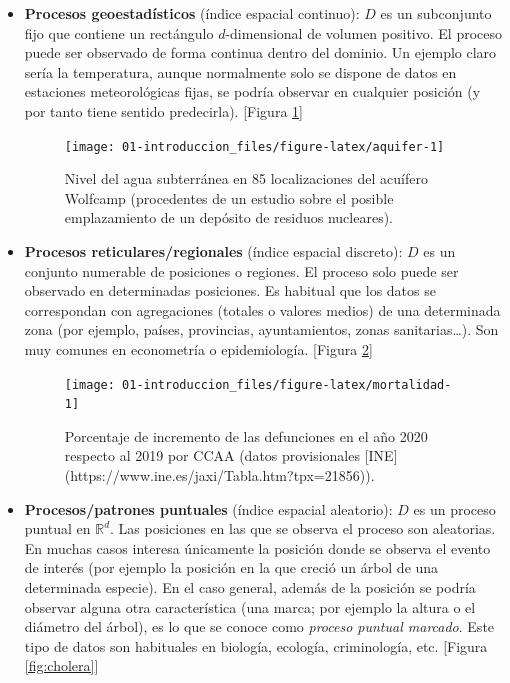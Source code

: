 \documentclass[
  spanish,
]{book}
\theoremstyle{break}
\begin{document}
\begin{itemize}
\item
  \textbf{Procesos geoestadísticos} (índice espacial continuo):
  \(D\) es un subconjunto fijo que contiene un rectángulo \(d\)-dimensional de volumen
  positivo. El proceso puede ser observado de forma continua dentro del dominio.
  Un ejemplo claro sería la temperatura, aunque normalmente solo se dispone de datos en
  estaciones meteorológicas fijas, se podría observar en cualquier posición
  (y por tanto tiene sentido predecirla). {[}Figura \ref{fig:aquifer}{]}

  \begin{figure}[!htb]

  {\centering \texttt{[image: 01-introduccion\_files/figure-latex/aquifer-1]} 

  }

  \caption{Nivel del agua subterránea en 85 localizaciones del acuífero Wolfcamp (procedentes de un estudio sobre el posible emplazamiento de un depósito de residuos nucleares).}\label{fig:aquifer}
  \end{figure}
\item
  \textbf{Procesos reticulares/regionales} (índice espacial discreto):
  \(D\) es un conjunto numerable de posiciones o regiones. El proceso solo puede ser
  observado en determinadas posiciones. Es habitual que los datos se correspondan
  con agregaciones (totales o valores medios) de una determinada zona (por ejemplo,
  países, provincias, ayuntamientos, zonas sanitarias\ldots). Son muy comunes en
  econometría o epidemiología. {[}Figura \ref{fig:mortalidad}{]}

  \begin{figure}[!htb]

  {\centering \texttt{[image: 01-introduccion\_files/figure-latex/mortalidad-1]} 

  }

  \caption{Porcentaje de incremento de las defunciones en el año 2020 respecto al 2019 por CCAA (datos provisionales [INE](https://www.ine.es/jaxi/Tabla.htm?tpx=21856)).}\label{fig:mortalidad}
  \end{figure}
\item
  \textbf{Procesos/patrones puntuales} (índice espacial aleatorio):
  \(D\) es un proceso puntual en \(\mathbb{R}^{d}\). Las posiciones en las que se
  observa el proceso son aleatorias. En muchas casos interesa únicamente la posición
  donde se observa el evento de interés (por ejemplo la posición en la que creció
  un árbol de una determinada especie). En el caso general, además de la posición
  se podría observar alguna otra característica (una marca; por ejemplo la altura o
  el diámetro del árbol), es lo que se conoce como \emph{proceso puntual marcado}.
  Este tipo de datos son habituales en biología, ecología, criminología, etc.
  {[}Figura \ref{fig:cholera}{]}


\end{itemize}
\end{document}
